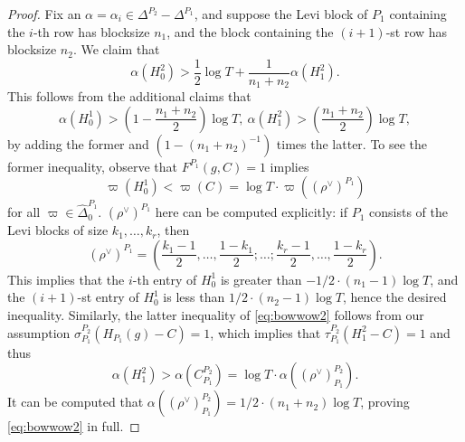 \documentclass[10pt,a4paper]{amsart}
\begin{document}
\begin{proof}
Fix an $\alpha = \alpha_i \in \Delta^{P_2}-\Delta^{P_1}$, and suppose the Levi block of $P_1$ containing the $i$-th row has blocksize $n_1$, and the block containing the $(i+1)$-st row has blocksize $n_2$. We claim that
\begin{equation}\label{eq:bowwow}
\alpha(H_0^2) > \frac{1}{2}\log T + \frac{1}{n_1+n_2}\alpha(H_1^2).
\end{equation}
This follows from the additional claims that
\begin{equation} \label{eq:bowwow2}
\alpha(H_0^1) > \left(1-\frac{n_1+n_2}{2}\right)\log T, \ \alpha(H_1^2) > \left(\frac{n_1+n_2}{2}\right)\log T,
\end{equation}
by adding the former and $(1-(n_1+n_2)^{-1})$ times the latter.
To see the former inequality, observe that $F^{P_1}(g,C) = 1$ implies
\begin{equation*}
\varpi(H_0^1) < \varpi(C) = \log T \cdot \varpi((\rho^\vee)^{P_1})
\end{equation*}
for all $\varpi \in \widehat\Delta_0^{P_1}$. $(\rho^\vee)^{P_1}$ here can be computed explicitly: if $P_1$ consists of the Levi blocks of size $k_1,\ldots,k_r$, then
\begin{equation*}
(\rho^\vee)^{P_1} = \left(\frac{k_1-1}{2}, \ldots, \frac{1-k_1}{2}; \ldots ; \frac{k_r-1}{2}, \ldots, \frac{1-k_r}{2} \right).
\end{equation*}
This implies that the $i$-th entry of $H_0^1$ is greater than $-1/2 \cdot (n_1-1)\log T$, and the $(i+1)$-st entry of $H_0^1$ is less than $1/2 \cdot (n_2-1)\log T$, hence the desired inequality. Similarly, the latter inequality of \eqref{eq:bowwow2} follows from our assumption $\sigma_{P_1}^{P_2}(H_{P_1}(g) - C) = 1$, which implies that $\tau_{P_1}^{P_2}(H_1^2 - C) = 1$ and thus
\begin{equation*}
\alpha(H_1^2) > \alpha(C_{P_1}^{P_2}) = \log T \cdot \alpha((\rho^\vee)_{P_1}^{P_2}).
\end{equation*}
It can be computed that $\alpha((\rho^\vee)_{P_1}^{P_2}) = 1/2 \cdot (n_1 + n_2)\log T$, proving \eqref{eq:bowwow2} in full.


\end{proof}
\end{document}

